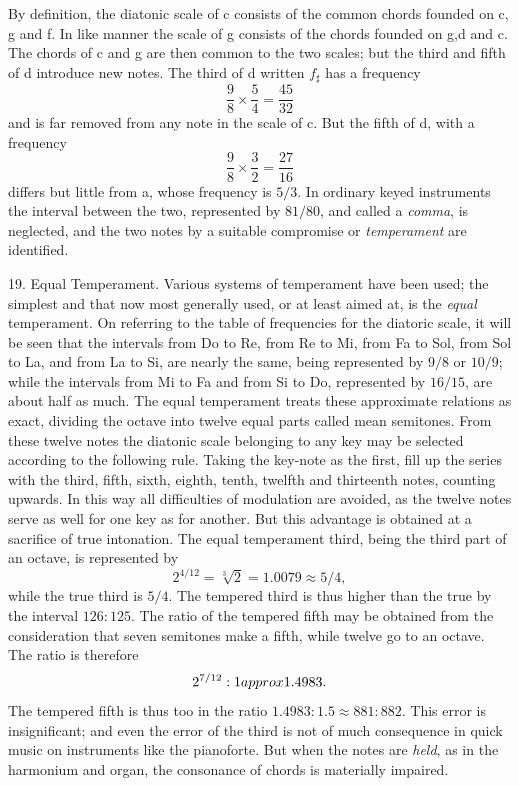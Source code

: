 By definition, the diatonic scale of c consists of the common chords founded on
c, g and f. In like manner the scale of g consists of the chords founded on g,d
and c. The chords of c and g are then common to the two scales; but the third
and fifth of d introduce new notes.  The third of d written \(f_{\sharp}\) has
a frequency
\[ \frac{9}{8} \times \frac{5}{4} = \frac{45}{32} \]
and is far
removed from any note in the scale of c. But the fifth of d, with a frequency
\[ \frac{9}{8} \times \frac{3}{2} = \frac{27}{16} \]
differs but little from a,
whose frequency is \(5/3\).  In ordinary keyed instruments the interval between
the two, represented by \(81/80\), and called a \textit{comma}, is neglected,
and the two notes by a suitable compromise or \textit{temperament} are
identified.

19.  Equal Temperament.  Various systems of temperament have been used; the
simplest and that now most generally used, or at least aimed at, is the
\textit{equal} temperament.  On referring to the table of frequencies for the
diatoric scale, it will be seen that the intervals from Do to Re, from Re to
Mi, from Fa to Sol, from Sol to La, and from La to Si, are nearly the same,
being represented by \(9/8\) or \(10/9\); while the intervals from Mi to Fa and
from Si to Do, represented by \(16/15\), are about half as much. The equal
temperament treats these approximate relations as exact, dividing the octave
into twelve equal parts called mean semitones. From these twelve notes the
diatonic scale belonging to any key may be selected according to the following
rule. Taking the key-note as the first, fill up the series with the third,
fifth, sixth, eighth, tenth, twelfth and thirteenth notes, counting upwards. In
this way all difficulties of modulation are avoided, as the twelve notes serve
as well for one key as for another. But this advantage is obtained at a
sacrifice of true intonation. The equal temperament third, being the third part
of an octave, is represented by
\[2^{4/12} = \sqrt[3]{2} = 1.0079 \approx 5/4,\]
while the true third is \(5/4\). The tempered third is thus higher than
the true by the interval \(126:125\). The ratio of the tempered fifth may be
obtained from the consideration that seven semitones make a fifth, while twelve
go to an octave. The ratio is therefore
\[2^{7/12} : 1 \\approx 1.4983.\]
The tempered fifth is thus too in the ratio \(1.4983  : 1.5 \approx 881 : 882\).
This error is insignificant; and even the error of the third is not of much
consequence in quick music on instruments like the pianoforte. But when the
notes are \textit{held}, as in the harmonium and organ, the consonance of
chords is materially impaired.

